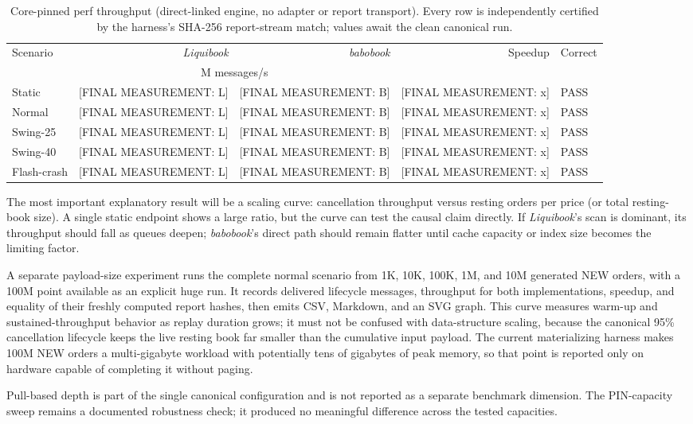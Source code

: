 \documentclass[10pt,twocolumn]{article}
\newcommand{\todo}[1]{\textcolor{red!70!black}{[FINAL MEASUREMENT: #1]}}
\begin{document}
\begin{table}[h]
\centering
\caption{Core-pinned perf throughput (direct-linked engine, no adapter or report
transport). Every row is independently certified by the harness's SHA-256
report-stream match; values await the clean canonical run.}
\label{tab:results}
\scriptsize
\begin{tabular}{@{}lrrrl@{}}
\toprule
Scenario & \textit{Liquibook} & \textit{babobook} & Speedup & Correct \\
 & \multicolumn{2}{c}{M messages/s} & & \\
\midrule
Static & \todo{L} & \todo{B} & \todo{x} & PASS \\
Normal & \todo{L} & \todo{B} & \todo{x} & PASS \\
Swing-25 & \todo{L} & \todo{B} & \todo{x} & PASS \\
Swing-40 & \todo{L} & \todo{B} & \todo{x} & PASS \\
Flash-crash & \todo{L} & \todo{B} & \todo{x} & PASS \\
\bottomrule
\end{tabular}
\end{table}

The most important explanatory result will be a scaling curve: cancellation
throughput versus resting orders per price (or total resting-book size).  A
single static endpoint shows a large ratio, but the curve can test the causal
claim directly.  If \textit{Liquibook}'s scan is dominant, its throughput should fall as
queues deepen; \textit{babobook}'s direct path should remain flatter until cache capacity or
index size becomes the limiting factor.

A separate payload-size experiment runs the complete normal scenario from 1K,
10K, 100K, 1M, and 10M generated NEW orders, with a 100M point available as an
explicit huge run.  It records delivered lifecycle messages, throughput for both
implementations, speedup, and equality of their freshly computed report hashes,
then emits CSV, Markdown, and an SVG graph.  This curve measures warm-up and
sustained-throughput behavior as replay duration grows; it must not be confused
with data-structure scaling, because the canonical 95\% cancellation lifecycle
keeps the live resting book far smaller than the cumulative input payload.  The
current materializing harness makes 100M NEW orders a multi-gigabyte workload
with potentially tens of gigabytes of peak memory, so that point is reported
only on hardware capable of completing it without paging.

Pull-based depth is part of the single canonical configuration and is not
reported as a separate benchmark dimension.  The PIN-capacity sweep remains a
documented robustness check; it produced no meaningful difference across the
tested capacities.
\end{document}
